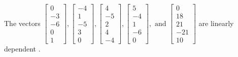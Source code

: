 \begin{exercise}
\begin{exerciseStatement}
  \end{exerciseStatement}
  \begin{exerciseAnswer}
   The vectors \(\left[\begin{array}{r}
0 \\
-3 \\
-6 \\
0 \\
1
\end{array}\right] , \left[\begin{array}{r}
-4 \\
1 \\
-5 \\
3 \\
0
\end{array}\right] , \left[\begin{array}{r}
4 \\
-5 \\
2 \\
4 \\
-4
\end{array}\right] , \left[\begin{array}{r}
5 \\
-4 \\
1 \\
-6 \\
0
\end{array}\right] , \text{ and } \left[\begin{array}{r}
0 \\
18 \\
21 \\
-21 \\
10
\end{array}\right]\) are 
  	 linearly dependent  .
  


  \end{exerciseAnswer}
\end{exercise}